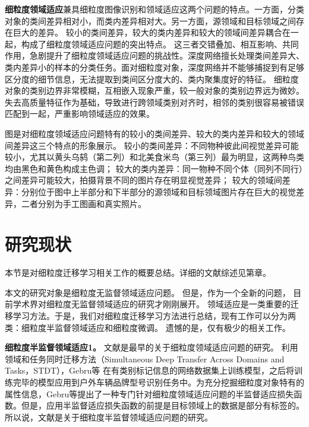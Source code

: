 

\textbf{细粒度领域适应}兼具细粒度图像识别和领域适应这两个问题的特点。一方面，分类对象的类间差异相对小，而类内差异相对大。另一方面，源领域和目标领域之间存在巨大的差异。
{\kaishu 较小的类间差异}，{\kaishu 较大的类内差异}和{\kaishu 较大的领域间差异}耦合在一起，构成了细粒度领域适应问题的突出特点。
这三者交错叠加、相互影响、共同作用，急剧提升了细粒度领域适应问题的挑战性。深度网络擅长处理类间差异大、类内差异小的样本的分类任务。面对细粒度对象，深度网络并不能够捕捉到有足够区分度的细节信息，无法提取到类间区分度大的、类内聚集度好的特征。
细粒度对象的类别边界非常模糊，互相嵌入现象严重，较一般对象的类别边界远为微妙。
失去高质量特征作为基础，导致进行跨领域类别对齐时，相邻的类别很容易被错误匹配到一起，严重影响领域适应的效果。



图是对细粒度领域适应问题特有的较小的类间差异、较大的类内差异和较大的领域间差异这三个特点的形象展示。
较小的类间差异：不同物种彼此间视觉差异可能较小，尤其以黄头乌鸫（第二列）和北美食米鸟（第三列）最为明显，这两种鸟类均由黑色和黄色构成主色调；
较大的类内差异：同一物种不同个体（同列不同行）之间差异可能较大，拍摄背景不同的图片存在明显视觉差异；
较大的领域间差异：分别位于图中上半部分和下半部分的源领域和目标领域图片存在巨大的视觉差异，二者分别为手工图画和真实照片。




\section{研究现状}
本节是对细粒度迁移学习相关工作的概要总结。详细的文献综述见第章。

本文的研究对象是{\kaishu 细粒度无监督领域适应问题}。
但是，作为一个全新的问题，{ 目前学术界对细粒度无监督领域适应的研究才刚刚展开}。
领域适应是一类重要的迁移学习方法。于是，我们对细粒度迁移学习方法进行总结，现有工作可以分为两类：细粒度半监督领域适应和细粒度微调。
遗憾的是，仅有极少的相关工作。

\textbf{细粒度半监督领域适应1。}
文献\cite{Feifei2017fine}是最早的关于细粒度领域适应问题的研究。
利用领域和任务同时迁移方法（Simultaneous Deep Transfer Across Domains and Tasks，STDT）\cite{tzeng2015simultaneous}，Gebru等 \cite{Feifei2017fine}在有类别标记信息的网络数据集上训练模型，之后将训练完毕的模型应用到户外车辆品牌型号识别任务中。为充分挖掘细粒度对象特有的属性信息，Gebru等提出了一种专门针对细粒度领域适应问题的半监督适应损失函数。但是，应用半监督适应损失函数的前提是目标领域上的数据是部分有标签的。所以说，文献\cite{Feifei2017fine}是关于细粒度半监督领域适应问题的研究。


